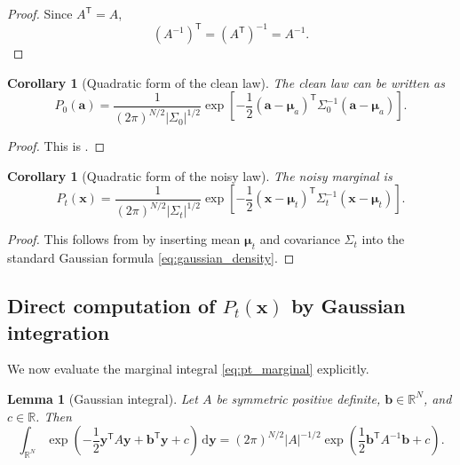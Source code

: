 \documentclass[11pt]{article}
\numberwithin{equation}{section}
\newtheorem{lemma}[theorem]{Lemma}
\newtheorem{corollary}[theorem]{Corollary}
\theoremstyle{definition}
\theoremstyle{remark}
\newcommand{\R}{\mathbb{R}}
\newcommand{\trans}{\mathsf{T}}
\newcommand{\diff}{\,\mathrm{d}}
\begin{document}
\begin{proof}
Since $A^\trans=A$,
\[
(A^{-1})^\trans = (A^\trans)^{-1}=A^{-1}.
\]
\end{proof}

\begin{corollary}[Quadratic form of the clean law]
The clean law can be written as
\[
P_0(\mathbf a)
=
\frac{1}{(2\pi)^{N/2}|\Sigma_0|^{1/2}}
\exp\!\left[-\frac12(\mathbf a-\boldsymbol{\mu}_a)^\trans\Sigma_0^{-1}(\mathbf a-\boldsymbol{\mu}_a)\right].
\]
\end{corollary}

\begin{proof}
This is .
\end{proof}

\begin{corollary}[Quadratic form of the noisy law]\label{cor:pt_quadratic}
The noisy marginal is
\begin{equation}\label{eq:pt_quadratic}
P_t(\mathbf x)
=
\frac{1}{(2\pi)^{N/2}|\Sigma_t|^{1/2}}
\exp\!\left[-\frac12(\mathbf x-\boldsymbol{\mu}_t)^\trans\Sigma_t^{-1}(\mathbf x-\boldsymbol{\mu}_t)\right].
\end{equation}
\end{corollary}

\begin{proof}
This follows from  by inserting mean $\boldsymbol{\mu}_t$ and covariance $\Sigma_t$ into the standard Gaussian formula \eqref{eq:gaussian_density}.
\end{proof}

\subsection{Direct computation of \texorpdfstring{$P_t(\mathbf x)$}{Pt(x)} by Gaussian integration}

We now evaluate the marginal integral \eqref{eq:pt_marginal} explicitly.

\begin{lemma}[Gaussian integral]\label{lem:gauss_int}
Let $A$ be symmetric positive definite, $\mathbf b\in\R^N$, and $c\in\R$. Then
\begin{equation}\label{eq:gauss_int}
\int_{\R^N}\exp\!\left(-\frac12\mathbf y^\trans A\mathbf y+\mathbf b^\trans\mathbf y+c\right)\diff\mathbf y
=
(2\pi)^{N/2}|A|^{-1/2}\exp\!\left(\frac12\mathbf b^\trans A^{-1}\mathbf b+c\right).
\end{equation}
\end{lemma}
\end{document}
